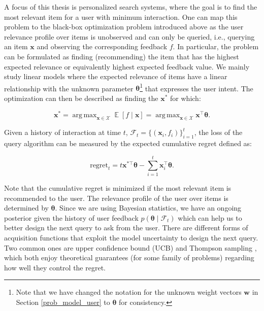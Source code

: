 \documentclass[dissertation,math,vertlayout,pdfa,colorlinks]{aaltoseries}
\newcommand{\bF}{\mathcal{F}}
\DeclareMathOperator{\E}{\mathbb{E}}
\newcommand{\tp}{^{\top}}
\DeclareMathOperator*{\argmax}{arg\,max}
\begin{document}
A focus of this thesis is personalized search systems, where the goal is to find the most relevant item for a user with minimum interaction. One can map this problem to the black-box optimization problem introduced above as the user relevance profile over items is unobserved and can only be queried, i.e., querying an item $\bm{x}$ and observing the corresponding feedback $f$. In particular, the problem can be formulated as finding (recommending) the item that has the highest expected relevance or equivalently highest expected feedback value. We mainly study linear models %
where the expected relevance of items have a linear relationship with the unknown parameter $\bm{\theta}$\footnote{Note that we have changed the notation for the unknown weight vectors $\bm{w}$ in Section \ref{prob_model_user} to $\bm{\theta}$ for consistency.} that expresses the user intent. The optimization can then be described as finding the $\bm{x}^*$ for which: 

\begin{equation}\label{Eq:black_box_optimization}
\bm{x}^* = \argmax_{\bm{x} \in \mathcal{X}} \E [f \mid \bm{x}] = \argmax_{\bm{x} \in \mathcal{X}} \bm{x}\tp \bm{\theta}.
\end{equation}

Given a history of interaction at time $t$, $\bF_t = \{(\bm{x}_i , f_i)\}_{i=1}^{t}$, the loss of the query algorithm can be measured by the expected cumulative regret defined as:

\begin{equation}\label{Eq:regret}
\textrm{regret}_t = t \bm{x}^{*\top} \bm{\theta} - \sum_{i=1}^{t} \bm{x}_i\tp \bm{\theta}.
\end{equation} 

\noindent Note that the cumulative regret is minimized if the most relevant item is recommended to the user. The relevance profile of the user over items is determined by $\bm{\theta}$. Since we are using Bayesian statistics, we have an ongoing posterior given the history of user feedback $p(\bm{\theta} \mid \bF_t)$ which can help us to better design the next query to ask from the user. %
There are different forms of acquisition functions that exploit the model uncertainty to design the next query. Two common ones are upper confidence bound (UCB) \cite{auer2002using,Bayes_UCB} and Thompson sampling \cite{agrawal2013thompson}, which both enjoy theoretical guarantees (for some family of problems) regarding how well they control the regret. 
\end{document}
